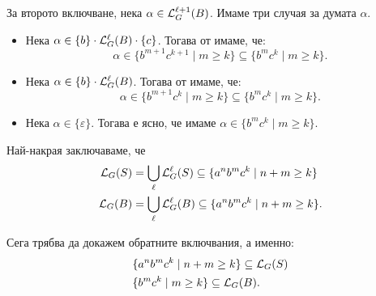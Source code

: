 \begin{extra}
\begin{example}
\begin{itemize}
    \end{itemize}
    За второто включване, нека $\alpha \in \mathcal{L}^{\ell+1}_G(B)$. Имаме три случая за думата $\alpha$.
    \begin{itemize}
    \item
      Нека $\alpha \in \{b\} \cdot \mathcal{L}^\ell_G(B) \cdot \{c\}$. Тогава от \IndHyp имаме, че:
      \[\alpha \in \{b^{m+1}c^{k+1} \mid m \geq k\} \subseteq \{b^mc^k \mid  m \geq k\}.\]
    \item
      Нека $\alpha \in \{b\} \cdot \mathcal{L}^\ell_G(B)$. Тогава от \IndHyp имаме, че:
      \[\alpha \in \{b^{m+1}c^{k} \mid m \geq k\} \subseteq \{b^mc^k \mid m \geq k\}.\]
    \item
      Нека $\alpha \in \{\varepsilon\}$. Тогава е ясно, че имаме $\alpha \in \{b^mc^k \mid m \geq k\}$.
    \end{itemize}  
    
    Най-накрая заключаваме, че
    \begin{align*}
      \mathcal{L}_G(S) & = \bigcup_\ell\mathcal{L}^\ell_G(S) \subseteq \{a^nb^mc^k \mid n+m \geq k\}\\
      \mathcal{L}_G(B) & = \bigcup_\ell\mathcal{L}^\ell_G(B) \subseteq \{a^nb^mc^k \mid n+m \geq k\}.
    \end{align*}
    
    Сега трябва да докажем обратните включвания, а именно:
    \begin{align}
      & \{a^nb^mc^k \mid n+m \geq k\} \subseteq \mathcal{L}_G(S) \label{eq:anbmck:S}\\
      & \{b^mc^k \mid m \geq k\} \subseteq \mathcal{L}_G(B). \label{eq:anbmck:B}
    \end{align}
    

\end{example}
\end{extra}
